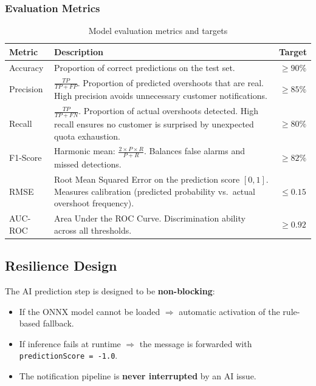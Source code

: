\subsubsection{Evaluation Metrics}

\begin{table}[H]
    \centering
    \caption{Model evaluation metrics and targets}
    \label{tab:metrics}
    \begin{tabularx}{\textwidth}{l X c}
\toprule
\textbf{Metric} & \textbf{Description} & \textbf{Target} \\
\midrule
Accuracy &
Proportion of correct predictions on the test set. &
$\geq 90\%$ \\
\addlinespace
Precision &
$\frac{TP}{TP + FP}$. Proportion of predicted overshoots that are real.
High precision avoids unnecessary customer notifications. &
$\geq 85\%$ \\
\addlinespace
Recall &
$\frac{TP}{TP + FN}$. Proportion of actual overshoots detected.
High recall ensures no customer is surprised by unexpected quota exhaustion. &
$\geq 80\%$ \\
\addlinespace
F1-Score &
Harmonic mean: $\frac{2 \times P \times R}{P + R}$.
Balances false alarms and missed detections. &
$\geq 82\%$ \\
\addlinespace
RMSE &
Root Mean Squared Error on the prediction score $[0, 1]$.
Measures calibration (predicted probability vs.\ actual overshoot frequency). &
$\leq 0.15$ \\
\addlinespace
AUC-ROC &
Area Under the ROC Curve. Discrimination ability across all thresholds. &
$\geq 0.92$ \\
\bottomrule
    \end{tabularx}
\end{table}

\subsection{Resilience Design}

The AI prediction step is designed to be \textbf{non-blocking}:
\begin{itemize}
    \item If the ONNX model cannot be loaded $\Rightarrow$ automatic activation of the rule-based fallback.
    \item If inference fails at runtime $\Rightarrow$ the message is forwarded with \texttt{predictionScore = -1.0}.
    \item The notification pipeline is \textbf{never interrupted} by an AI issue.
\end{itemize}

